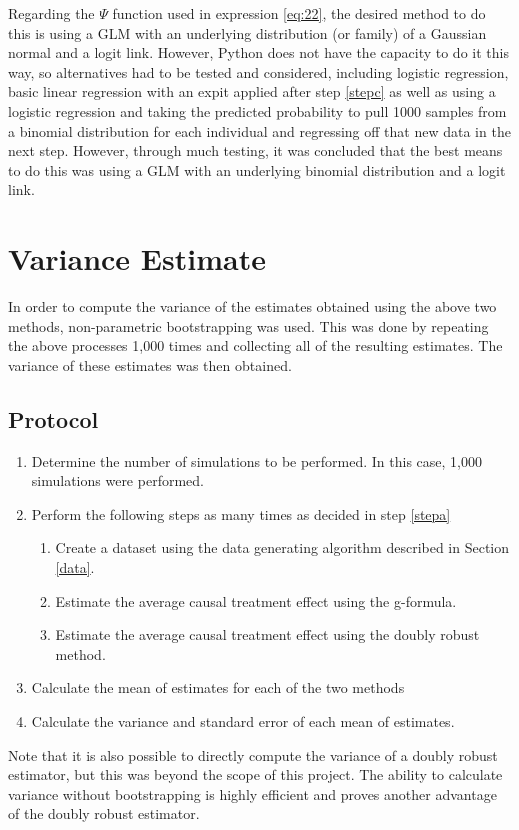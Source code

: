Regarding the $\Psi$ function used in expression \ref{eq:22}, the desired method to do this is using a GLM with an underlying distribution (or family) of a Gaussian normal and a logit link.  However, Python does not have the capacity to do it this way, so alternatives had to be tested and considered, including logistic regression, basic linear regression with an expit applied after step \ref{stepc} as well as using a logistic regression and taking the predicted probability to pull 1000 samples from a binomial distribution for each individual and regressing off that new data in the next step. However, through much testing, it was concluded that the best means to do this was using a GLM with an underlying binomial distribution and a logit link.  

\section{Variance Estimate} \label{VarianceBootStrap}
In order to compute the variance of the estimates obtained using the above two methods, non-parametric bootstrapping was used.  This was done by repeating the above processes 1,000 times and collecting all of the resulting estimates.  The variance of these estimates was then obtained.  

\subsection{Protocol}
\begin{enumerate} 
\item Determine the number of simulations to be performed.  In this case, 1,000 simulations were performed.  \label{stepa} 
\item Perform the following steps as many times as decided in step \ref{stepa} 
\begin{enumerate}
\item Create a dataset using the data generating algorithm described in Section \ref{data}.  
\item Estimate the average causal treatment effect using the g-formula.  
\item Estimate the average causal treatment effect using the doubly robust method.  
\end{enumerate} 
\item Calculate the mean of estimates for each of the two methods 
\item Calculate the variance and standard error of each mean of estimates.  
\end{enumerate} 

Note that it is also possible to directly compute the variance of a doubly robust estimator, but this was beyond the scope of this project.  The ability to calculate variance without bootstrapping is highly efficient and proves another advantage of the doubly robust estimator.  


